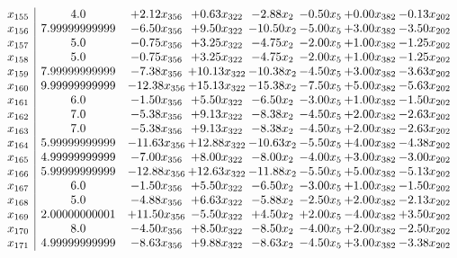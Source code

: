 \documentclass[8pt]{article}
\begin{document}
\[\begin{array}{c| c c@{\hskip 2pt} c@{\hskip 2pt} c@{\hskip 2pt} c@{\hskip 2pt} c@{\hskip 2pt} c@{\hskip 2pt} }
 x_{155}   &  4.0 & +  2.12 x_{356} & +  0.63 x_{322} & -2.88 x_{2} & -0.50 x_{5} & +  0.00 x_{382} & -0.13 x_{202}\\
 x_{156}   &  7.99999999999 & -6.50 x_{356} & +  9.50 x_{322} & -10.50 x_{2} & -5.00 x_{5} & +  3.00 x_{382} & -3.50 x_{202}\\
 x_{157}   &  5.0 & -0.75 x_{356} & +  3.25 x_{322} & -4.75 x_{2} & -2.00 x_{5} & +  1.00 x_{382} & -1.25 x_{202}\\
 x_{158}   &  5.0 & -0.75 x_{356} & +  3.25 x_{322} & -4.75 x_{2} & -2.00 x_{5} & +  1.00 x_{382} & -1.25 x_{202}\\
 x_{159}   &  7.99999999999 & -7.38 x_{356} & + 10.13 x_{322} & -10.38 x_{2} & -4.50 x_{5} & +  3.00 x_{382} & -3.63 x_{202}\\
 x_{160}   &  9.99999999999 & -12.38 x_{356} & + 15.13 x_{322} & -15.38 x_{2} & -7.50 x_{5} & +  5.00 x_{382} & -5.63 x_{202}\\
 x_{161}   &  6.0 & -1.50 x_{356} & +  5.50 x_{322} & -6.50 x_{2} & -3.00 x_{5} & +  1.00 x_{382} & -1.50 x_{202}\\
 x_{162}   &  7.0 & -5.38 x_{356} & +  9.13 x_{322} & -8.38 x_{2} & -4.50 x_{5} & +  2.00 x_{382} & -2.63 x_{202}\\
 x_{163}   &  7.0 & -5.38 x_{356} & +  9.13 x_{322} & -8.38 x_{2} & -4.50 x_{5} & +  2.00 x_{382} & -2.63 x_{202}\\
 x_{164}   &  5.99999999999 & -11.63 x_{356} & + 12.88 x_{322} & -10.63 x_{2} & -5.50 x_{5} & +  4.00 x_{382} & -4.38 x_{202}\\
 x_{165}   &  4.99999999999 & -7.00 x_{356} & +  8.00 x_{322} & -8.00 x_{2} & -4.00 x_{5} & +  3.00 x_{382} & -3.00 x_{202}\\
 x_{166}   &  5.99999999999 & -12.88 x_{356} & + 12.63 x_{322} & -11.88 x_{2} & -5.50 x_{5} & +  5.00 x_{382} & -5.13 x_{202}\\
 x_{167}   &  6.0 & -1.50 x_{356} & +  5.50 x_{322} & -6.50 x_{2} & -3.00 x_{5} & +  1.00 x_{382} & -1.50 x_{202}\\
 x_{168}   &  5.0 & -4.88 x_{356} & +  6.63 x_{322} & -5.88 x_{2} & -2.50 x_{5} & +  2.00 x_{382} & -2.13 x_{202}\\
 x_{169}   &  2.00000000001 & + 11.50 x_{356} & -5.50 x_{322} & +  4.50 x_{2} & +  2.00 x_{5} & -4.00 x_{382} & +  3.50 x_{202}\\
 x_{170}   &  8.0 & -4.50 x_{356} & +  8.50 x_{322} & -8.50 x_{2} & -4.00 x_{5} & +  2.00 x_{382} & -2.50 x_{202}\\
 x_{171}   &  4.99999999999 & -8.63 x_{356} & +  9.88 x_{322} & -8.63 x_{2} & -4.50 x_{5} & +  3.00 x_{382} & -3.38 x_{202}\\

\end{array}\]
\end{document}
